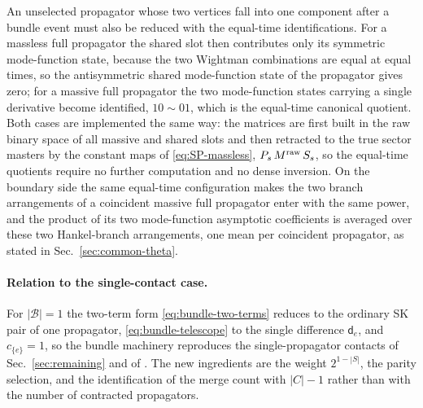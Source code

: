 \documentclass[11pt,a4paper]{article}
\numberwithin{table}{section}
\newcommand{\cB}{\mathcal B}
\begin{document}
An unselected propagator whose two vertices fall into one component after a bundle event must also be
reduced with the equal-time identifications. For a massless full propagator the shared slot then
contributes only its symmetric mode-function state,
because the two Wightman combinations are equal at equal times, so the antisymmetric shared
mode-function state of the
propagator gives zero; for a massive full propagator the two mode-function states carrying a single derivative become
identified, $10\sim01$, which is the equal-time canonical quotient. Both cases are implemented the
same way: the matrices are first built in the raw binary space of all massive and shared slots and
then retracted to the true sector masters by the constant maps of
\eqref{eq:SP-massless}, $P_s\,M^{\rm raw}\,S_s$, so the equal-time quotients require no further
computation and no dense inversion. On the boundary side the same equal-time configuration makes the two
branch arrangements of a coincident massive full propagator enter with the same power, and the product
of its two mode-function asymptotic coefficients is averaged over these two Hankel-branch arrangements,
one mean per coincident propagator, as stated in
Sec.~\ref{sec:common-theta}.

\paragraph{Relation to the single-contact case.}
For $|\cB|=1$ the two-term form \eqref{eq:bundle-two-terms} reduces to the ordinary SK pair of one
propagator, \eqref{eq:bundle-telescope} to the single difference $\mathsf d_e$, and $c_{\{e\}}=1$, so the
bundle machinery reproduces the single-propagator contacts of Sec.~\ref{sec:remaining} and of
\cite{Chen:2023iix}. The new ingredients are the
weight $2^{1-|S|}$, the parity selection, and the identification of the merge count with $|C|-1$
rather than with the number of contracted propagators.





\end{document}
